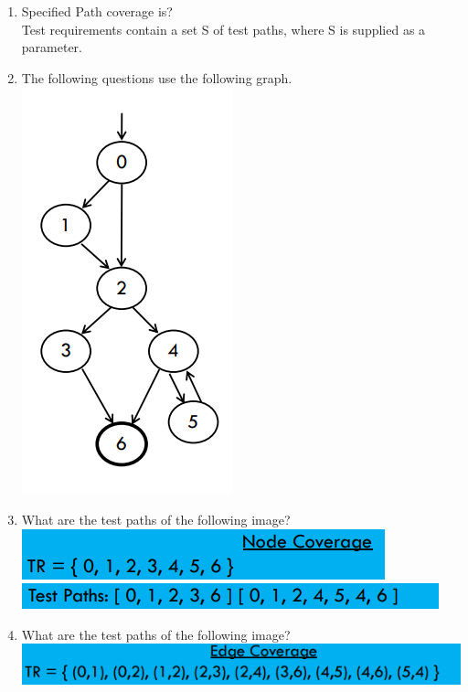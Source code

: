 \documentclass[10pt]{article}
\begin{document}
\begin{enumerate}
    \item Specified Path coverage is?\\
          Test requirements contain a set S of test paths, where S is supplied as a parameter.\\
    \item The following questions use the following graph.\\
          \includegraphics*[scale=.5]{graph1.png}\\
    \item What are the test paths of the following image?\\
          \includegraphics*[scale=.5]{nodec.png}\\
          \includegraphics*[scale=.5]{nodectp.png}\\
    \item What are the test paths of the following image?\\
          \includegraphics*[scale=.5]{edgec.png}\\

\end{enumerate}
\end{document}
